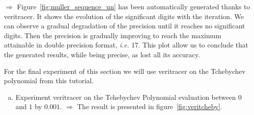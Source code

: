 \documentclass{TP}
\begin{document}
$\Rightarrow$ Figure~\ref{fig:muller_sequence_un} has been automatically generated thanks to veritracer. It shows the evolution of the significant digits with the iteration. We can observe a gradual degradation of the precision until it reaches no significant digits. Then the precision is gradually improving to reach the maximum attainable in double precision format, {\it i.e.} 17. This plot allow us to conclude that the generated results, while being precise, as lost all its accuracy.

For the final experiment of this section we will use veritracer on the Tchebychev polynomial from this tutorial.

\begin{question}
  \begin{enumerate}[(a)]
      \item Experiment veritracer on the Tchebychev Polynomial evaluation between $0$ and $1$ by $0.001$.
      $\Rightarrow$ The result is presented in figure~\ref{fig:veritcheby}.



%


  \end{enumerate}
\end{question}
\end{document}
